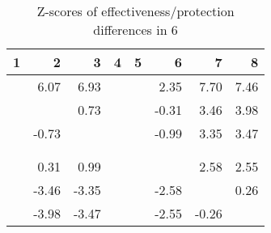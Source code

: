 \begin{table}[ht]
\centering
\begin{tabular}{rrrrrrrr}
  \hline
1 & 2 & 3 & 4 & 5 & 6 & 7 & 8 \\ 
  \hline
 & 6.07 & 6.93 &  &  & 2.35 & 7.70 & 7.46 \\ 
   &  & 0.73 &  &  & -0.31 & 3.46 & 3.98 \\ 
   & -0.73 &  &  &  & -0.99 & 3.35 & 3.47 \\ 
   &  &  &  &  &  &  &  \\ 
   &  &  &  &  &  &  &  \\ 
   & 0.31 & 0.99 &  &  &  & 2.58 & 2.55 \\ 
   & -3.46 & -3.35 &  &  & -2.58 &  & 0.26 \\ 
   & -3.98 & -3.47 &  &  & -2.55 & -0.26 &  \\ 
   \hline
\end{tabular}
\caption{Z-scores of effectiveness/protection differences in  6} 
\end{table}
